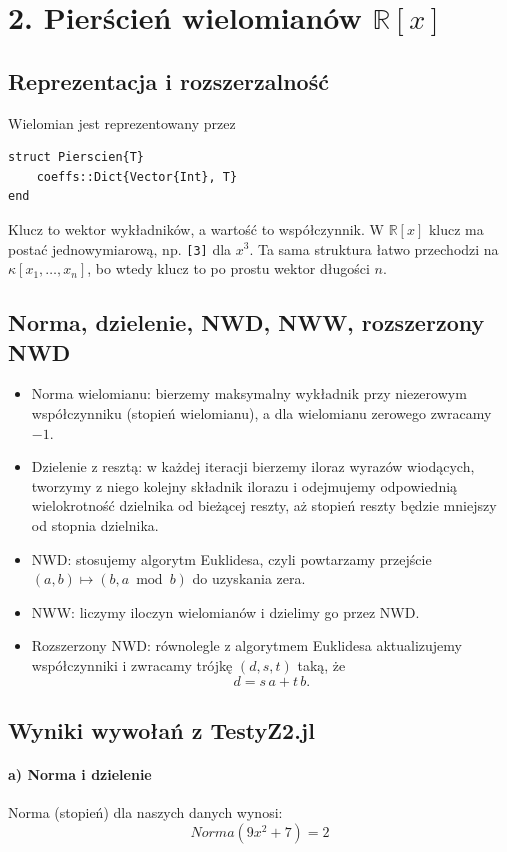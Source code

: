 \documentclass[12pt,a4paper]{article}
\begin{document}
\section*{2. Pierścień wielomianów $\mathbb{R}[x]$}

\subsection*{Reprezentacja i rozszerzalność}
Wielomian jest reprezentowany przez
\begin{verbatim}
struct Pierscien{T}
	coeffs::Dict{Vector{Int}, T}
end
\end{verbatim}
Klucz to wektor wykładników, a wartość to współczynnik.
W $\mathbb{R}[x]$ klucz ma postać jednowymiarową, np. \texttt{[3]} dla $x^3$.
Ta sama struktura łatwo przechodzi na $\kappa[x_1,\dots,x_n]$,
bo wtedy klucz to po prostu wektor długości $n$.

\subsection*{Norma, dzielenie, NWD, NWW, rozszerzony NWD}
\begin{itemize}
\item Norma wielomianu: bierzemy maksymalny wykładnik przy niezerowym współczynniku (stopień wielomianu), a dla wielomianu zerowego zwracamy $-1$.
\item Dzielenie z resztą: w każdej iteracji bierzemy iloraz wyrazów wiodących, tworzymy z niego kolejny składnik ilorazu i odejmujemy odpowiednią wielokrotność dzielnika od bieżącej reszty, aż stopień reszty będzie mniejszy od stopnia dzielnika.
\item NWD: stosujemy algorytm Euklidesa, czyli powtarzamy przejście $(a,b) \mapsto (b, a\bmod b)$ do uzyskania zera.
\item NWW: liczymy iloczyn wielomianów i dzielimy go przez NWD.
\item Rozszerzony NWD: równolegle z algorytmem Euklidesa aktualizujemy współczynniki i zwracamy trójkę $(d,s,t)$ taką, że
\[
d = s\,a + t\,b.
\]
\end{itemize}

\subsection*{Wyniki wywołań z TestyZ2.jl}

\paragraph{a) Norma i dzielenie}
Norma (stopień) dla naszych danych wynosi:
\[
Norma(9x^2+7)=2
\]
\end{document}
